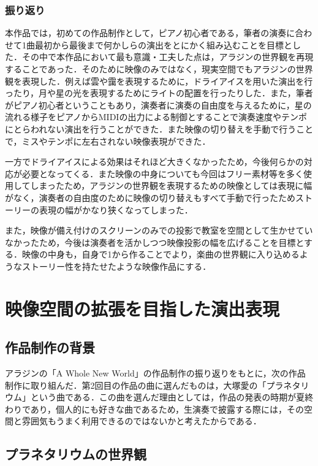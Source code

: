 \subsubsection{振り返り}
本作品では，初めての作品制作として，ピアノ初心者である，筆者の演奏に合わせて1曲最初から最後まで何かしらの演出をとにかく組み込むことを目標とした．その中で本作品において最も意識・工夫した点は，アラジンの世界観を再現することであった．そのために映像のみではなく，現実空間でもアラジンの世界観を表現した．例えば雲や靄を表現するために，ドライアイスを用いた演出を行ったり，月や星の光を表現するためにライトの配置を行ったりした．また，筆者がピアノ初心者ということもあり，演奏者に演奏の自由度を与えるために，星の流れる様子をピアノからMIDIの出力による制御とすることで演奏速度やテンポにとらわれない演出を行うことができた．また映像の切り替えを手動で行うことで，ミスやテンポに左右されない映像表現ができた．

一方でドライアイスによる効果はそれほど大きくなかったため，今後何らかの対応が必要となってくる．また映像の中身についても今回はフリー素材等を多く使用してしまったため，アラジンの世界観を表現するための映像としては表現に幅がなく，演奏者の自由度のために映像の切り替えもすべて手動で行ったためストーリーの表現の幅がかなり狭くなってしまった．

また，映像が備え付けのスクリーンのみでの投影で教室を空間として生かせていなかったため，今後は演奏者を活かしつつ映像投影の幅を広げることを目標とする．映像の中身も，自身で1から作ることでより，楽曲の世界観に入り込めるようなストーリー性を持たせたような映像作品にする．


\section{映像空間の拡張を目指した演出表現}
\subsection{作品制作の背景}
アラジンの「A Whole New World」の作品制作の振り返りをもとに，次の作品制作に取り組んだ．第2回目の作品の曲に選んだものは，大塚愛の「プラネタリウム」という曲である\cite{Planetarium}．この曲を選んだ理由としては，作品の発表の時期が夏終わりであり，個人的にも好きな曲であるため，生演奏で披露する際には，その空間と雰囲気もうまく利用できるのではないかと考えたからである．

\subsection{プラネタリウムの世界観}
